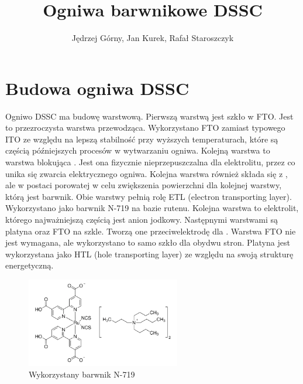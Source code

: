 \documentclass[a4, 12pt]{article}
\title{Ogniwa barwnikowe DSSC}
\author{Jędrzej Górny, Jan Kurek, Rafał Staroszczyk}
\date{}
\begin{document}
	\maketitle
	\section{Budowa ogniwa DSSC}
	Ogniwo DSSC ma budowę warstwową. Pierwszą warstwą jest szkło w FTO. Jest to przezroczysta warstwa przewodząca. Wykorzystano FTO zamiast typowego ITO ze względu na lepszą stabilność przy wyższych temperaturach, które są częścią późniejszych procesów w wytwarzaniu ogniwa. Kolejną warstwa to warstwa blokująca . Jest ona fizycznie nieprzepuszczalna dla elektrolitu, przez co unika się zwarcia elektrycznego ogniwa. Kolejna warstwa również składa się z , ale w postaci porowatej w celu zwiększenia powierzchni dla kolejnej warstwy, którą jest barwnik. Obie warstwy  pełnią rolę ETL (electron transporting layer). Wykorzystano jako barwnik N-719 na bazie rutenu. Kolejna warstwa to elektrolit, którego najważniejszą częścią jest anion jodkowy. Następnymi warstwami są platyna oraz FTO na szkle. Tworzą one przeciwelektrodę dla . Warstwa FTO nie jest wymagana, ale wykorzystano to samo szkło dla obydwu stron. Platyna jest wykorzystana jako HTL (hole transporting layer) ze względu na swoją strukturę energetyczną. 
	\begin{figure}[H]
		\centering
		\includegraphics[width=0.6\textwidth]{n719.png}
		\caption{Wykorzystany barwnik N-719}
	\end{figure}
	
\end{document}
